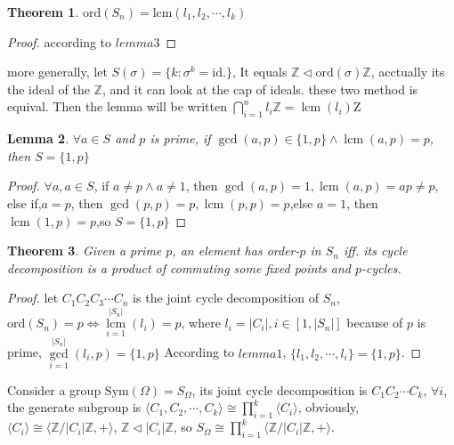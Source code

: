 \documentclass[10pt,a4paper]{article}
\newtheorem{theorem}{Theorem}[section]
\newtheorem{lemma}[theorem]{Lemma}
\begin{document}
\begin{theorem}
    $\mathrm{ord}(S_n)=\mathrm{lcm}(l_1,l_2,\cdots,l_k)$
\end{theorem}

\begin{proof}
    according to $lemma3$
\end{proof} 

more generally, let $S(\sigma)=\{k:\sigma^k=\mathrm{id.}\}$, It equals $\mathbb{Z}\triangleleft\mathrm{ord}(\sigma)\mathbb{Z}$,
acctually its the ideal of the $\mathbb{Z}$, and it can look at the cap of ideals. these two method is equival.
Then the lemma will be written $\bigcap\limits_{i=1}^{n}l_i\mathbb{Z}=\operatorname{lcm}(l_i)\mathrm{Z}$

\begin{lemma}
    $\forall a\in S$ and $p$ is prime, if $\gcd(a,p)\in\{1,p\}\land\operatorname{lcm}(a,p)=p$, then $S=\{1,p\}$
\end{lemma}

\begin{proof}
    $\forall a,a\in S$, if $a\ne p\land a\ne 1$, then $\gcd(a,p)=1,\operatorname{lcm}(a,p)=ap\ne p$,
    else if,$a=p$, then $\gcd(p,p)=p,\operatorname{lcm}(p,p)=p$,else $a=1$, then $\operatorname{lcm}(1,p)=p$,so $S=\{1,p\}$
\end{proof}

\begin{theorem}
    Given a prime $p$, an element has order-$p$ in $S_n$ iff. its cycle decomposition is a product of commuting some fixed points and $p$-cycles.
\end{theorem}

\begin{proof}
    let $C_1C_2C_3\cdots C_n$ is the joint cycle decomposition of $S_n$, 
    $\mathrm{ord}(S_n)=p\iff\operatorname{lcm}\limits_{i=1}^{|S_n|}(l_i)=p$, where $l_i=|C_i|,i\in[1,|S_n|]$
    because of $p$ is prime, $\gcd\limits_{i=1}^{|S_n|}(l_i,p)=\{1,p\}$
    According to $lemma 1$, $\{l_1,l_2,\cdots,l_i\}=\{1,p\}$.
\end{proof} 
 
Consider a group $\mathrm{Sym}(\Omega)=S_\Omega$, its joint cycle decomposition is 
$C_1C_2\cdots C_k$, $\forall i$, the generate subgroup is
$\langle C_1,C_2,\cdots,C_k\rangle\cong\prod\limits_{i=1}^{k}\langle C_i\rangle$, obviously,
$\langle C_i\rangle\cong\langle\mathbb{Z}/|C_i|\mathbb{Z},+\rangle$, $\mathbb{Z}\triangleleft|C_i|\mathbb{Z}$,
so $S_{\Omega}\cong\prod\limits_{i=1}^{k}\langle\mathbb{Z}/|C_i|\mathbb{Z},+\rangle$.
\end{document}
